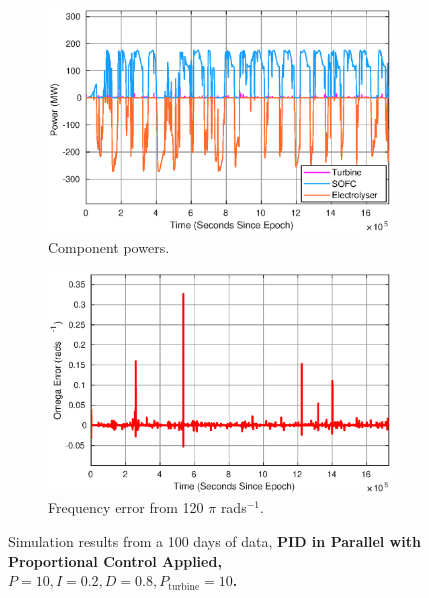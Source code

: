 \begin{figure}
\centering
\begin{subfigure}{.5\textwidth}
  \centering
  \includegraphics[width=1\linewidth]{images/results/PID/power.eps}
  \caption{Component powers.}
  \label{fig:piduse}
\end{subfigure}%
\begin{subfigure}{.5\textwidth}
  \centering
  \includegraphics[width=1\linewidth]{images/results/PID/omega.eps}
  \caption{Frequency error from 120 $\pi$ rads$^{-1}$.}
  \label{fig:pidpower}
\end{subfigure}
\caption{Simulation results from a 100 days of data, {\bf PID in Parallel with Proportional Control Applied, $P= 10,I= 0.2,D= 0.8, P_{\mathrm{turbine}} = 10$.}}
\label{fig:power-PID-sim}
\end{figure}








